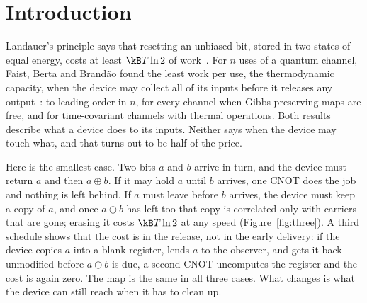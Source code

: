 \section{Introduction}\label{sec:intro}

Landauer's principle says that resetting an unbiased bit, stored in two states of equal energy, costs at least $\kB T\ln2$ of work~\cite{Landauer61}. For $n$ uses of a quantum channel, Faist, Berta and Brand\~ao found the least work per use, the thermodynamic capacity, when the device may collect all of its inputs before it releases any output~\cite{FBB19,FBB21}: to leading order in $n$, for every channel when Gibbs-preserving maps are free, and for time-covariant channels with thermal operations. Both results describe what a device does to its inputs. Neither says when the device may touch what, and that turns out to be half of the price.

Here is the smallest case. Two bits $a$ and $b$ arrive in turn, and the device must return $a$ and then $a\oplus b$. If it may hold $a$ until $b$ arrives, one CNOT does the job and nothing is left behind. If $a$ must leave before $b$ arrives, the device must keep a copy of $a$, and once $a\oplus b$ has left too that copy is correlated only with carriers that are gone; erasing it costs $\kB T\ln2$ at any speed (Figure~\ref{fig:three}). A third schedule shows that the cost is in the release, not in the early delivery: if the device copies $a$ into a blank register, lends $a$ to the observer, and gets it back unmodified before $a\oplus b$ is due, a second CNOT uncomputes the register and the cost is again zero. The map is the same in all three cases. What changes is what the device can still reach when it has to clean up.

